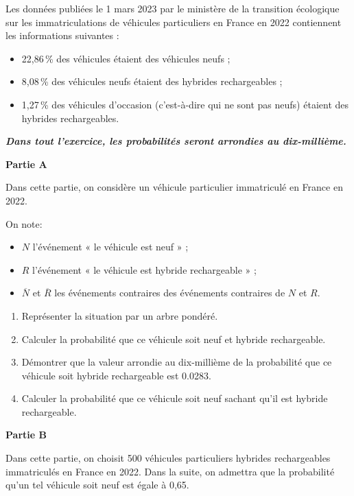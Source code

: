 Les données publiées le 1 mars 2023 par le ministère de la transition écologique sur les immatriculations de véhicules particuliers en France en 2022 contiennent les informations suivantes :

\begin{itemize}
	\item 22,86\,\% des véhicules étaient des véhicules neufs ;
	\item 8,08\,\% des véhicules neufs étaient des hybrides rechargeables ;
	\item 1,27\,\% des véhicules d'occasion (c'est-à-dire qui ne sont pas neufs) étaient des hybrides rechargeables.
\end{itemize}

\textbf{\textit{Dans tout l'exercice, les probabilités seront arrondies au dix-millième.}}

\medskip

\textbf{\large Partie A}

\medskip

Dans cette partie, on considère un véhicule particulier immatriculé en France en 2022.

On note:

\begin{itemize}
	\item $N$ l'événement « le véhicule est neuf » ;
	\item $R$ l'événement « le véhicule est hybride rechargeable » ;
	\item $\overline{N}$ et $\overline{R}$ les événements contraires des événements contraires de $N$ et $R$.
\end{itemize}

\begin{enumerate}
	\item Représenter la situation par un arbre pondéré.
	\item Calculer la probabilité que ce véhicule soit neuf et hybride rechargeable.
	\item Démontrer que la valeur arrondie au dix-millième de la probabilité que ce véhicule soit hybride rechargeable est \num{0,0283}.
	\item Calculer la probabilité que ce véhicule soit neuf sachant qu'il est hybride rechargeable.
\end{enumerate}

\smallskip

\textbf{\large Partie B}

\medskip

Dans cette partie, on choisit 500 véhicules particuliers hybrides rechargeables immatriculés en France en 2022. Dans la suite, on admettra que la probabilité qu'un tel véhicule soit neuf est égale à 0,65.

